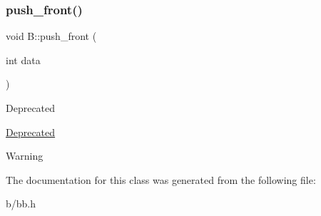 \subsubsection{\texorpdfstring{push\+\_\+front()}{push\_front()}}
{\footnotesize\ttfamily void B\+::push\+\_\+front (\begin{DoxyParamCaption}\item[{int}]{data }\end{DoxyParamCaption})}

\begin{DoxyRefDesc}{Deprecated}
\item[\hyperlink{deprecated__deprecated000003}{Deprecated}]\end{DoxyRefDesc}


\begin{DoxyWarning}{Warning}

\end{DoxyWarning}


The documentation for this class was generated from the following file\+:\begin{DoxyCompactItemize}
\item 
b/bb.\+h\end{DoxyCompactItemize}
